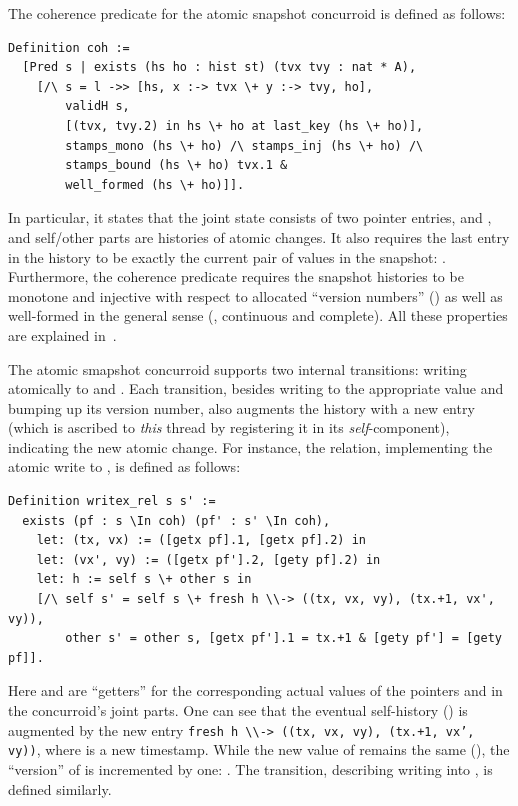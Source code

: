 The coherence predicate for the atomic snapshot concurroid is defined
as follows:

\begin{lstlisting}
Definition coh := 
  [Pred s | exists (hs ho : hist st) (tvx tvy : nat * A), 
    [/\ s = l ->> [hs, x :-> tvx \+ y :-> tvy, ho], 
        validH s,
        [(tvx, tvy.2) in hs \+ ho at last_key (hs \+ ho)],
        stamps_mono (hs \+ ho) /\ stamps_inj (hs \+ ho) /\ 
        stamps_bound (hs \+ ho) tvx.1 &
        well_formed (hs \+ ho)]].  
\end{lstlisting}

In particular, it states that the joint state consists of two pointer
entries, \code{x :-> tvx} and \code{y :-> tvy}, and self/other parts
are histories of atomic changes. It also requires the last entry in
the history to be exactly the current pair of values in the snapshot:
\code{[(tvx, tvy.2) in hs \+ ho at last_key (hs \+ ho)]}. Furthermore,
the coherence predicate requires the snapshot histories to be monotone
and injective with respect to allocated ``version numbers''
() as well as well-formed in the general sense (\ie,
continuous and complete). All these properties are explained
in~\cite[\S 2]{Sergey-al:ESOP15}.

The atomic smapshot concurroid supports two internal transitions:
writing atomically to \code{x} and \code{y}. Each transition, besides
writing to the appropriate value and bumping up its version number,
also augments the history with a new entry (which is ascribed to
\emph{this} thread by registering it in its \emph{self}-component),
indicating the new atomic change. For instance, the relation,
implementing the atomic write to , is defined as follows:

\begin{lstlisting}
Definition writex_rel s s' :=
  exists (pf : s \In coh) (pf' : s' \In coh), 
    let: (tx, vx) := ([getx pf].1, [getx pf].2) in
    let: (vx', vy) := ([getx pf'].2, [gety pf].2) in
    let: h := self s \+ other s in
    [/\ self s' = self s \+ fresh h \\-> ((tx, vx, vy), (tx.+1, vx', vy)), 
        other s' = other s, [getx pf'].1 = tx.+1 & [gety pf'] = [gety pf]].
\end{lstlisting}

Here \code{[getx pf]} and \code{[gety pf]} are ``getters'' for the
corresponding actual values of the pointers \code{x} and \code{y} in
the concurroid's joint parts. One can see that the eventual
self-history () is augmented by the new entry \texttt{\small{fresh
  h \textbackslash\textbackslash -> ((tx, vx, vy), (tx.+1, vx', vy))}}, where  is a
new timestamp. While the new value of \code{y} remains the same
(\code{[gety pf'] = [gety pf]}), the ``version'' of  is
incremented by one: .
%
The transition, describing writing into , is defined
similarly. 

